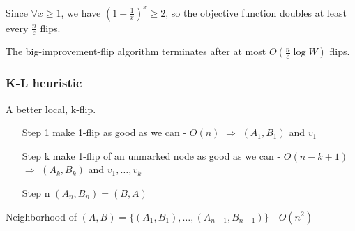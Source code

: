 Since $\forall x\ge 1$, we have $\left( 1+\frac{1}{x} \right)^x\ge 2$, so the objective function doubles at least every $\frac{n}{\varepsilon}$  flips.

\begin{claim}
    The big-improvement-flip algorithm terminates after at most $O\left( \frac{n}{\varepsilon}\log W \right)$ flips.
\end{claim}

\subsubsection{K-L heuristic}
A better local, k-flip. 
\begin{enumerate}
    \item [Step 1] make 1-flip as good as we can - $O(n)$ $\Rightarrow$ $(A_1, B_1)$ and $v_1$
    \item [Step k] make 1-flip of an unmarked node as good as we can - $O(n-k+1)$ $\Rightarrow$ $(A_k, B_k)$ and $v_1, \dots, v_k$
    \item [Step n] $(A_n, B_n)=(B, A)$
\end{enumerate}
Neighborhood of $(A, B) = \{ (A_1, B_1), \dots, (A_{n-1}, B_{n-1}) \}$ - $O(n^2)$

